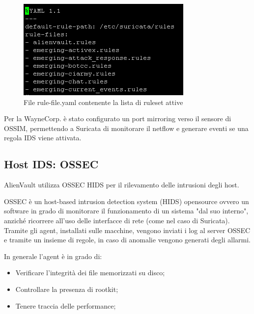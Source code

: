 \begin{figure}[h]
    \begin{center}
        \includegraphics[width=0.80\columnwidth]{images/4_caso_d'uso_img/suricataYaml.png}
    \end{center}
    \caption{File rule-file.yaml contenente la lista di ruleset attive}
    \label{fig:File rule-file.yaml contenente la lista di ruleset attive}
\end{figure}

Per la WayneCorp. è stato configurato un port mirroring verso il sensore di OSSIM, permettendo a Suricata di monitorare il netflow e generare eventi se una regola IDS viene attivata.

\subsection{Host IDS: OSSEC}

AlienVault utilizza OSSEC HIDS per il rilevamento delle intrusioni degli host.\par
OSSEC è un host-based intrusion detection system (HIDS) opensource ovvero un software in grado di monitorare il funzionamento di un sistema "dal suo interno", anziché ricorrere all'uso delle interfacce di rete (come nel caso di Suricata).
Tramite gli agent, installati sulle macchine, vengono inviati i log al server OSSEC e tramite un insieme di regole, in caso di anomalie vengono generati degli allarmi.\par
In generale l’agent è in grado di:

\begin{itemize}
    \item Verificare l'integrità dei file memorizzati su disco;
    \item Controllare la presenza di rootkit;
    \item Tenere traccia delle performance;
\end{itemize}

